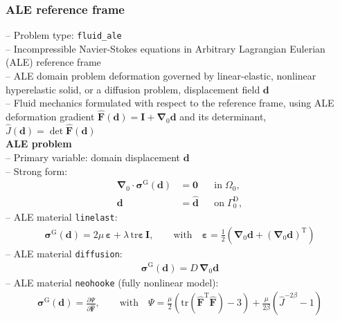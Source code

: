 \documentclass[a4paper,12pt]{report}
\newcommand{\bs}[1]{\boldsymbol{#1}}
\newcommand{\Om}{\mathit{\Omega}}
\newcommand{\Gm}{\mathit{\Gamma}}
\begin{document}
\subsubsection{ALE reference frame}\label{ale-reference-frame}

-- Problem type: \verb.fluid_ale.\\

-- Incompressible Navier-Stokes equations in Arbitrary Lagrangian Eulerian (ALE) reference frame\\

-- ALE domain problem deformation governed by linear-elastic, nonlinear hyperelastic solid, or a diffusion problem, displacement field $\bs{d}$\\

-- Fluid mechanics formulated with respect to the reference frame, using ALE deformation gradient $\widehat{\bs{F}}(\bs{d}) = \bs{I} + \bs{\nabla}_0\bs{d}$ and its determinant, $\widehat{J}(\bs{d})=\det \widehat{\bs{F}}(\bs{d})$\\

\textbf{ALE problem}\\

-- Primary variable: domain displacement $\bs{d}$\\

-- Strong form:
\begin{equation}
\label{equation-ale-strong-form}
\begin{aligned}
\bs{\nabla}_{0} \cdot \bs{\sigma}^{\mathrm{G}}(\bs{d}) &= \bs{0} &&\text{in} \; \mathit{\Om}_0, \\
\bs{d} &= \hat{\bs{d}} &&\text{on} \; \mathit{\Gm}_0^{\mathrm{D}},
\end{aligned}
\end{equation}
-- ALE material \verb.linelast.:
\begin{equation}
\begin{aligned}
\bs{\sigma}^{\mathrm{G}}(\bs{d}) = 2\mu \,\bs{\varepsilon} + \lambda \,\mathrm{tr}\bs{\varepsilon}\,\bs{I}, \qquad \text{with}\quad \bs{\varepsilon} = \frac{1}{2}\left(\bs{\nabla}_0\bs{d} + (\bs{\nabla}_0\bs{d})^{\mathrm{T}}\right)
\end{aligned}
\end{equation}
-- ALE material \verb.diffusion.:
\begin{equation}
\begin{aligned}
\bs{\sigma}^{\mathrm{G}}(\bs{d}) = D \,\bs{\nabla}_0\bs{d}
\end{aligned}
\end{equation}
-- ALE material \verb.neohooke. (fully nonlinear model):
\begin{equation}
\begin{aligned}
\bs{\sigma}^{\mathrm{G}}(\bs{d}) = \frac{\partial \mathit{\Psi}}{\partial \widehat{\bs{F}}}, \qquad \text{with}\quad \mathit{\Psi} = \frac{\mu}{2}\left(\mathrm{tr}(\widehat{\bs{F}}^{\mathrm{T}}\widehat{\bs{F}}) - 3\right) + \frac{\mu}{2\beta} \left(\widehat{J}^{-2\beta} - 1\right)
\end{aligned}
\end{equation}
\end{document}

